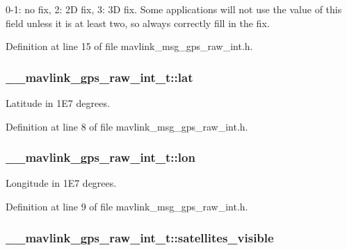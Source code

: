0-\/1\-: no fix, 2\-: 2\-D fix, 3\-: 3\-D fix. Some applications will not use the value of this field unless it is at least two, so always correctly fill in the fix. 



Definition at line 15 of file mavlink\-\_\-msg\-\_\-gps\-\_\-raw\-\_\-int.\-h.

\hypertarget{struct____mavlink__gps__raw__int__t_aefd27d0b2d23c58a59b218aa151220d3}{
\subsubsection[{lat}]{ \-\_\-\-\_\-mavlink\-\_\-gps\-\_\-raw\-\_\-int\-\_\-t\-::lat}}\label{struct____mavlink__gps__raw__int__t_aefd27d0b2d23c58a59b218aa151220d3}


Latitude in 1\-E7 degrees. 



Definition at line 8 of file mavlink\-\_\-msg\-\_\-gps\-\_\-raw\-\_\-int.\-h.

\hypertarget{struct____mavlink__gps__raw__int__t_a025fd2dd700ff7180af5a26c2a3497f4}{
\subsubsection[{lon}]{ \-\_\-\-\_\-mavlink\-\_\-gps\-\_\-raw\-\_\-int\-\_\-t\-::lon}}\label{struct____mavlink__gps__raw__int__t_a025fd2dd700ff7180af5a26c2a3497f4}


Longitude in 1\-E7 degrees. 



Definition at line 9 of file mavlink\-\_\-msg\-\_\-gps\-\_\-raw\-\_\-int.\-h.

\hypertarget{struct____mavlink__gps__raw__int__t_af1481a191aa3ffbf832dc3a4c35cbf09}{
\subsubsection[{satellites\-\_\-visible}]{ \-\_\-\-\_\-mavlink\-\_\-gps\-\_\-raw\-\_\-int\-\_\-t\-::satellites\-\_\-visible}}\label{struct____mavlink__gps__raw__int__t_af1481a191aa3ffbf832dc3a4c35cbf09}



